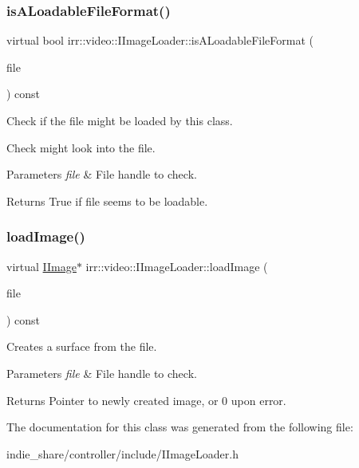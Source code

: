 \subsubsection{\texorpdfstring{is\+A\+Loadable\+File\+Format()}{isALoadableFileFormat()}}
{\footnotesize\ttfamily virtual bool irr\+::video\+::\+I\+Image\+Loader\+::is\+A\+Loadable\+File\+Format (\begin{DoxyParamCaption}\item[{\hyperlink{classirr_1_1io_1_1IReadFile}{io\+::\+I\+Read\+File} $\ast$}]{file }\end{DoxyParamCaption}) const\hspace{0.3cm}{\ttfamily [pure virtual]}}



Check if the file might be loaded by this class. 

Check might look into the file. 
\begin{DoxyParams}{Parameters}
{\em file} & File handle to check. \\
\hline
\end{DoxyParams}
\begin{DoxyReturn}{Returns}
True if file seems to be loadable. 
\end{DoxyReturn}
\mbox{\label{classirr_1_1video_1_1IImageLoader_ac3cafd8396e2f6e762f91604bcacf5d3}} 
\subsubsection{\texorpdfstring{load\+Image()}{loadImage()}}
{\footnotesize\ttfamily virtual \hyperlink{classirr_1_1video_1_1IImage}{I\+Image}$\ast$ irr\+::video\+::\+I\+Image\+Loader\+::load\+Image (\begin{DoxyParamCaption}\item[{\hyperlink{classirr_1_1io_1_1IReadFile}{io\+::\+I\+Read\+File} $\ast$}]{file }\end{DoxyParamCaption}) const\hspace{0.3cm}{\ttfamily [pure virtual]}}



Creates a surface from the file. 


\begin{DoxyParams}{Parameters}
{\em file} & File handle to check. \\
\hline
\end{DoxyParams}
\begin{DoxyReturn}{Returns}
Pointer to newly created image, or 0 upon error. 
\end{DoxyReturn}


The documentation for this class was generated from the following file\+:\begin{DoxyCompactItemize}
\item 
indie\+\_\+share/controller/include/I\+Image\+Loader.\+h\end{DoxyCompactItemize}
